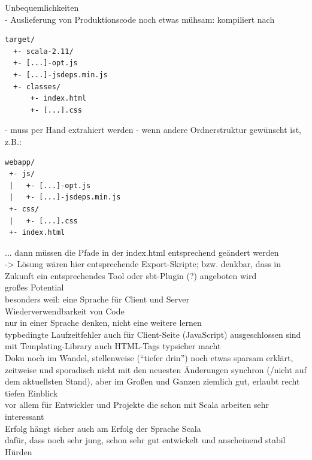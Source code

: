 \documentclass[a4paper, 12pt, hidelinks, listof=totoc, listoftables=totoc, bibliography=totoc]{scrreprt}
\begin{document}
Unbequemlichkeiten \\
  - Auslieferung von Produktionscode noch etwas mühsam: kompiliert nach \\
\begin{lstlisting}
target/
  +- scala-2.11/
  +- [...]-opt.js
  +- [...]-jsdeps.min.js
  +- classes/
      +- index.html
      +- [...].css
\end{lstlisting}
  - muss per Hand extrahiert werden
  - wenn andere Ordnerstruktur gewünscht ist, z.B.:
\begin{lstlisting}
webapp/
 +- js/
 |   +- [...]-opt.js
 |   +- [...]-jsdeps.min.js
 +- css/
 |   +- [...].css
 +- index.html
\end{lstlisting}
  ... dann müssen die Pfade in der index.html entsprechend geändert werden \\
  -> Lösung wären hier entsprechende Export-Skripte; bzw. denkbar, dass in Zukunft ein entsprechendes Tool oder sbt-Plugin (?) angeboten wird \\



großes Potential \\
	besonders weil: eine Sprache für Client und Server \\
		Wiederverwendbarkeit von Code \\
		nur in einer Sprache denken, nicht eine weitere lernen \\
	typbedingte Laufzeitfehler auch für Client-Seite (JavaScript) ausgeschlossen sind \\
	mit Templating-Library auch HTML-Tags typsicher macht \\
	
Doku noch im Wandel, stellenweise ("`tiefer drin"') noch etwas sparsam erklärt, zeitweise und sporadisch nicht mit den neuesten Änderungen synchron (/nicht auf dem aktuellsten Stand), aber im Großen und Ganzen ziemlich gut, erlaubt recht tiefen Einblick \\

vor allem für Entwickler und Projekte die schon mit Scala arbeiten sehr interessant \\

Erfolg hängt sicher auch am Erfolg der Sprache Scala \\
dafür, dass noch sehr jung, schon sehr gut entwickelt und anscheinend stabil \\




Hürden \\
\end{document}
